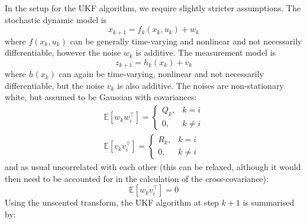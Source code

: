 \documentclass[11pt]{report} %
\begin{document}
In the setup for the UKF algorithm, we require slightly stricter assumptions. The stochastic dynamic model is
\begin{equation}
x_{k + 1} = f_{k}\left(x_{k}, u_{k}\right) + w_{k}
\end{equation}
where $f\left(x_{k}, u_{k}\right)$ can be generally time-varying and nonlinear and not necessarily differentiable, however the noise $w_{k}$ is additive. The measurement model is
\begin{equation}
z_{k + 1} = h_{k}\left(x_{k}\right) + v_{k}
\end{equation}
where $h\left(x_{k}\right)$ can again be time-varying, nonlinear and not necessarily differentiable, but the noise $v_{k}$ is also additive. The noises are non-stationary white, but assumed to be Gaussian with covariances:
\begin{gather}
\mathbb{E}\left[w_{k}w_{i}^{\top}\right] = \begin{cases} Q_{k}, & k = i \\ 0, & k \neq i \end{cases} \\
\mathbb{E}\left[v_{k}v_{i}^{\top}\right] = \begin{cases} R_{k}, & k = i \\ 0, & k \neq i \end{cases}
\end{gather}
and as usual uncorrelated with each other (this can be relaxed, although it would then need to be accounted for in the calculation of the cross-covariance):
\begin{equation}
\mathbb{E}\left[w_{k}v_{i}^{\top}\right] = 0
\end{equation}
Using the unscented transform, the UKF algorithm at step $k + 1$ is summarised by:
\end{document}
